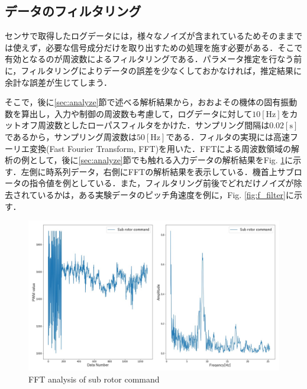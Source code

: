 \subsection{データのフィルタリング}
\label{sec:filter}

センサで取得したログデータには，様々なノイズが含まれているためそのままでは使えず，必要な信号成分だけを取り出すための処理を施す必要がある．そこで有効となるのが周波数によるフィルタリングである．パラメータ推定を行なう前に，フィルタリングによりデータの誤差を少なくしておかなければ，推定結果に余計な誤差が生じてしまう．

そこで，後に\ref{sec:analyze}節で述べる解析結果から，おおよその機体の固有振動数を算出し，入力や制御の周波数も考慮して，ログデータに対して$10\mathrm{[Hz]}$をカットオフ周波数としたローパスフィルタをかけた．サンプリング間隔は$0.02\mathrm{[s]}$であるから，サンプリング周波数は$50\mathrm{[Hz]}$である．フィルタの実現には高速フーリエ変換(Fast Fourier Transform, FFT)を用いた．FFTによる周波数領域の解析の例として，後に\ref{sec:analyze}節でも触れる入力データの解析結果をFig. \ref{fig:f_input}に示す．左側に時系列データ，右側にFFTの解析結果を表示している．機首上サブロータの指令値を例としている．また，フィルタリング前後でどれだけノイズが除去されているかは，ある実験データのピッチ角速度を例に，Fig. \ref{fig:f_filter}に示す．

\begin{figure}[H]
	\centering
	\includegraphics[clip,width=13.0cm,bb=0 0 1440 864]{./z_figure_files/chapter4/sub_input.jpeg}
	\caption{FFT analysis of sub rotor command}
	\label{fig:f_input}
\end{figure}


